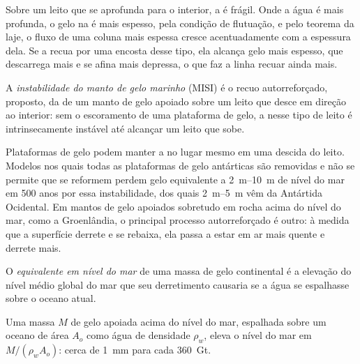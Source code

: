 Sobre um leito que se aprofunda para o interior, a  é frágil. Onde a
água é mais profunda, o gelo na  é mais espesso, pela condição de flutuação, e
pelo teorema da laje, o fluxo de uma coluna mais espessa cresce acentuadamente com a espessura
dela. Se a  recua por uma encosta desse tipo, ela alcança gelo mais espesso,
que descarrega mais e se afina mais depressa,
o que faz a linha recuar ainda mais.

\begin{definition}\label{def:b3:glaciology:misi}
A \emph{instabilidade do manto de gelo marinho}
(MISI) é o recuo autorreforçado, proposto, da  de um manto de gelo
apoiado sobre um leito que desce em direção ao interior: sem o escoramento de uma
plataforma de gelo, a  nesse tipo de leito é intrinsecamente instável
até alcançar um leito que sobe.
\end{definition}

Plataformas de gelo podem manter a  no lugar mesmo em uma descida do leito.
Modelos nos quais todas as plataformas de gelo antárticas são removidas e não se permite que se reformem
perdem gelo equivalente a \qtyrange{2}{10}{m} de nível do mar em 500
anos por essa instabilidade, dos quais \qtyrange{2}{5}{m} vêm da Antártida Ocidental.
Em mantos de gelo apoiados sobretudo em rocha acima do nível do mar, como
a Groenlândia, o principal processo autorreforçado é outro: à medida que a superfície
derrete e se rebaixa, ela passa a estar em ar mais quente e derrete mais.

\begin{definition}\label{def:b3:glaciology:sle}
O \emph{equivalente em nível do mar} de uma massa de
gelo continental é a elevação do nível médio global do mar que seu derretimento
causaria se a água se espalhasse sobre o oceano atual.
\end{definition}

\begin{proposition}\label{prop:b3:glaciology:sle}
Uma massa $M$ de gelo apoiada acima do nível do mar, espalhada sobre um oceano de área
$A_o$ como água de densidade $\rho_w$, eleva o nível do mar em $M/(\rho_wA_o)$:
cerca de \qty{1}{mm} para cada \qty{360}{Gt}.
\end{proposition}

